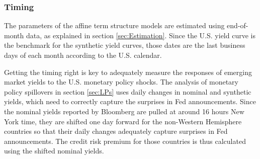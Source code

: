 {%

\subsubsection{Timing}
The parameters of the affine term structure models are estimated using end-of-month data, as explained in section \ref{sec:Estimation}.
Since the U.S. yield curve is the benchmark for the synthetic yield curves, those dates are the last business days of each month according to the U.S. calendar.

Getting the timing right is key to adequately measure the responses of emerging market yields to the U.S. monetary policy shocks.
The analysis of monetary policy spillovers in section \ref{sec:LPs} uses daily changes in nominal and synthetic yields, which need to correctly capture the surprises in Fed announcements.
Since the nominal yields reported by Bloomberg are pulled at around 16 hours New York time, they are shifted one day forward for the non-Western Hemisphere countries so that their daily changes adequately capture surprises in Fed announcements.
The credit risk premium for those countries is thus calculated using the shifted nominal yields.



}{}	%


